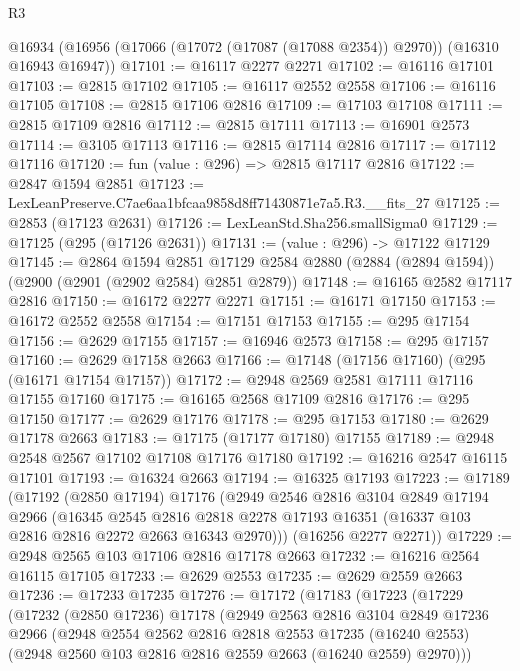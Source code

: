 \begin{lexlean}{R3}
\begin{coremodule}
  @16934 (@16956 (@17066 (@17072 (@17087 (@17088 @2354)) @2970)) (@16310 @16943 @16947))
@17101 := @16117 @2277 @2271
@17102 := @16116 @17101
@17103 := @2815 @17102
@17105 := @16117 @2552 @2558
@17106 := @16116 @17105
@17108 := @2815 @17106 @2816
@17109 := @17103 @17108
@17111 := @2815 @17109 @2816
@17112 := @2815 @17111
@17113 := @16901 @2573
@17114 := @3105 @17113
@17116 := @2815 @17114 @2816
@17117 := @17112 @17116
@17120 := fun (value : @296) => @2815 @17117 @2816
@17122 := @2847 @1594 @2851
@17123 := LexLeanPreserve.C7ae6aa1bfcaa9858d8ff71430871e7a5.R3.__fits_27
@17125 := @2853 (@17123 @2631)
@17126 := LexLeanStd.Sha256.smallSigma0
@17129 := @17125 (@295 (@17126 @2631))
@17131 := (value : @296) -> @17122 @17129
@17145 := @2864
    @1594
    @2851
    @17129
    @2584
    @2880
    (@2884 (@2894 @1594))
    (@2900 (@2901 (@2902 @2584) @2851 @2879))
@17148 := @16165 @2582 @17117 @2816
@17150 := @16172 @2277 @2271
@17151 := @16171 @17150
@17153 := @16172 @2552 @2558
@17154 := @17151 @17153
@17155 := @295 @17154
@17156 := @2629 @17155
@17157 := @16946 @2573
@17158 := @295 @17157
@17160 := @2629 @17158 @2663
@17166 := @17148 (@17156 @17160) (@295 (@16171 @17154 @17157))
@17172 := @2948 @2569 @2581 @17111 @17116 @17155 @17160
@17175 := @16165 @2568 @17109 @2816
@17176 := @295 @17150
@17177 := @2629 @17176
@17178 := @295 @17153
@17180 := @2629 @17178 @2663
@17183 := @17175 (@17177 @17180) @17155
@17189 := @2948 @2548 @2567 @17102 @17108 @17176 @17180
@17192 := @16216 @2547 @16115 @17101
@17193 := @16324 @2663
@17194 := @16325 @17193
@17223 := @17189
    (@17192
      (@2850 @17194)
      @17176
      (@2949
        @2546
        @2816
        @3104
        @2849
        @17194
        @2966
        (@16345
          @2545
          @2816
          @2818
          @2278
          @17193
          @16351
          (@16337 @103 @2816 @2816 @2272 @2663 @16343 @2970)))
      (@16256 @2277 @2271))
@17229 := @2948 @2565 @103 @17106 @2816 @17178 @2663
@17232 := @16216 @2564 @16115 @17105
@17233 := @2629 @2553
@17235 := @2629 @2559 @2663
@17236 := @17233 @17235
@17276 := @17172
    (@17183
      (@17223
        (@17229
          (@17232
            (@2850 @17236)
            @17178
            (@2949
              @2563
              @2816
              @3104
              @2849
              @17236
              @2966
              (@2948
                @2554
                @2562
                @2816
                @2818
                @2553
                @17235
                (@16240 @2553)
                (@2948 @2560 @103 @2816 @2816 @2559 @2663 (@16240 @2559) @2970)))

\end{coremodule}
\end{lexlean}
